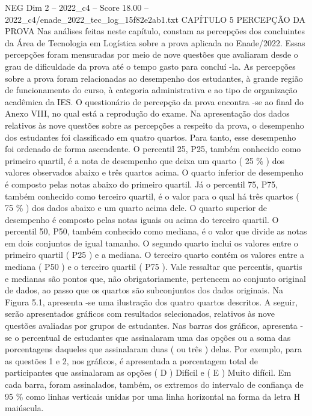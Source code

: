 \begin{textsample}{NEG Dim 2 – 2022\_c4 – Score 18.00 – 2022\_c4/enade\_2022\_tec\_log\_15f82e2ab1.txt}  \label{ex:f2_neg_407}
CAPÍTULO 5 PERCEPÇÃO DA PROVA Nas análises feitas neste capítulo, constam as percepções dos concluintes da Área de Tecnologia em Logística sobre a prova aplicada no Enade/2022.
Essas percepções foram mensuradas por meio de nove questões que avaliaram desde o grau de dificuldade da prova até o tempo gasto para concluí -la.
As percepções sobre a prova foram relacionadas ao desempenho dos estudantes, à grande região de funcionamento do curso, à categoria administrativa e ao tipo de organização acadêmica da IES.
O questionário de percepção da prova encontra -se ao final do Anexo VIII, no qual está a reprodução do exame.
Na apresentação dos dados relativos às nove questões sobre as percepções a respeito da prova, o desempenho dos estudantes foi classificado em quatro quartos.
Para tanto, esse desempenho foi ordenado de forma ascendente.
O percentil 25, P25, também conhecido como primeiro quartil, é a nota de desempenho que deixa um quarto ( 25 \% ) dos valores observados abaixo e três quartos acima.
O quarto inferior de desempenho é composto pelas notas abaixo do primeiro quartil.
Já o percentil 75, P75, também conhecido como terceiro quartil, é o valor para o qual há três quartos ( 75 \% ) dos dados abaixo e um quarto acima dele.
O quarto superior de desempenho é composto pelas notas iguais ou acima do terceiro quartil.
O percentil 50, P50, também conhecido como mediana, é o valor que divide as notas em dois conjuntos de igual tamanho.
O segundo quarto inclui os valores entre o primeiro quartil ( P25 ) e a mediana.
O terceiro quarto contém os valores entre a mediana ( P50 ) e o terceiro quartil ( P75 ).
Vale ressaltar que percentis, quartis e medianas são pontos que, não obrigatoriamente, pertencem ao conjunto original de dados, ao passo que os quartos são subconjuntos dos dados originais.
Na Figura 5.1, apresenta -se uma ilustração dos quatro quartos descritos.
A seguir, serão apresentados gráficos com resultados selecionados, relativos às nove questões avaliadas por grupos de estudantes.
Nas barras dos gráficos, apresenta -se o percentual de estudantes que assinalaram uma das opções ou a soma das porcentagens daqueles que assinalaram duas ( ou três ) delas.
Por exemplo, para as questões 1 e 2, nos gráficos, é apresentada a porcentagem total de participantes que assinalaram as opções ( D ) Difícil e ( E ) Muito difícil.
Em cada barra, foram assinalados, também, os extremos do intervalo de confiança de 95 \% como linhas verticais unidas por uma linha horizontal na forma da letra H maiúscula.

\end{textsample}
